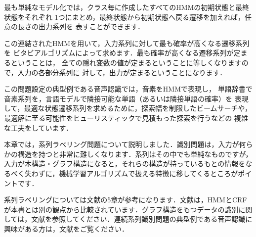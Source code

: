 最も単純なモデル化では，クラス毎に作成したすべてのHMMの初期状態と最終状態をそれぞれ
1つにまとめ，最終状態から初期状態へ戻る遷移を加えれば，任意の長さの出力系列を
表すことができます．


この連結されたHMMを用いて，入力系列に対して最も確率が高くなる遷移系列を
ビタビアルゴリズムによって求めます．最も確率が高くなる遷移系列が定まるということは，
全ての隠れ変数の値が定まるということに等しくなりますので，入力の各部分系列に
対して，出力が定まるということになります．


この問題設定の典型例である音声認識では，音素をHMMで表現し，
単語辞書で音素系列を，言語モデルで隣接可能な単語（あるいは隣接単語の確率）を
表現して，最適な状態遷移系列を求めるために，探索幅を制限したビームサーチや，
最適解に至る可能性をヒューリスティックで見積もった探索を行うなどの
複雑な工夫をしています．

本章では，系列ラベリング問題について説明しました．識別問題は，入力が何らかの構造を持つと非常に難しくなります．系列はその中でも単純なものですが，入力が木構造・グラフ構造になると，それらの構造が持っているもとの情報をなるべく失わずに，機械学習アルゴリズムで扱える特徴に移してくるところがポイントです．

系列ラベリングについては文献\cite{takamura10}の5章が参考になります．文献\cite{tsuboi06}は，HMMとCRFが本書とは別の観点から比較されています．グラフ構造をもつデータの識別に関しては，文献\cite{kashima10}を参照してください．連続系列識別問題の典型例である音声認識に興味がある方は，文献\cite{araki07}をご覧ください．
